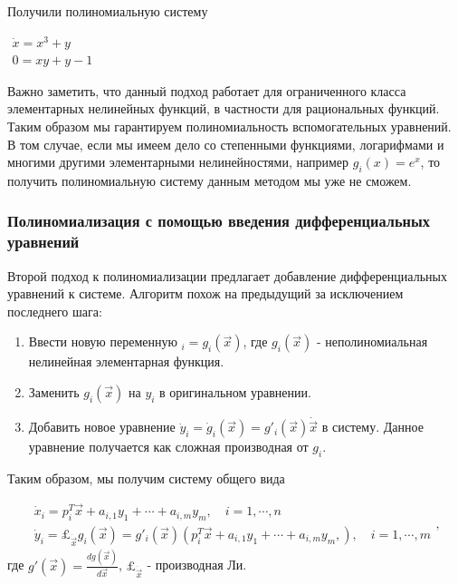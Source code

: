 Получили полиномиальную систему

$\begin{array}{lcl}
    \dot x = x^3 + y \\
    0 = xy + y - 1
\end{array}$
\newline

\begin{remark}
Важно заметить, что данный подход работает для ограниченного класса элементарных нелинейных функций, в частности для рациональных функций. Таким образом мы гарантируем полиномиальность вспомогательных уравнений. В том случае, если мы имеем дело со степенными функциями, логарифмами и многими другими элементарными нелинейностями, например $g_i(x) = e^x$, то получить полиномиальную систему данным методом мы уже не сможем.
\end{remark}


\subsubsection{Полиномиализация с помощью введения дифференциальных уравнений} \label{poly-diff}

Второй подход к полиномиализации предлагает добавление дифференциальных уравнений к системе.
Алгоритм похож на предыдущий за исключением последнего шага:

\begin{enumerate}
    \item Ввести новую переменную $_i = g_i(\vec x)$, где $g_i(\vec x)$ - неполиномиальная нелинейная элементарная функция.
    \item Заменить $g_i(\vec x)$ на $y_i$ в оригинальном уравнении.
    \item Добавить новое уравнение $\dot y_i = \dot g_i(\vec x) = g'_i(\vec x) \dot {\vec x}$ в систему. Данное уравнение получается как сложная производная от $g_i$.
\end{enumerate}
\newline

Таким образом, мы получим систему общего вида

\begin{equation}
    \begin{array}{lcl}
        \dot x_i = p_i^T \vec x + a_{i,1} y_1 + \cdots + a_{i,m} y_m,\quad i = 1, \cdots, n \\
        \dot y_i = \pounds_{\dot{\vec x}} g_i(\vec x) = g'_i(\vec x)(p_i^T \vec x + a_{i,1} y_1 + \cdots + a_{i,m} y_m,),\quad i = 1, \cdots, m
    \end{array},
\end{equation}
\newline
где $g'(\vec x) = \frac {dg(\vec x)}{d \vec x}$, $\pounds_{\dot{\vec x}}$ - производная Ли.

